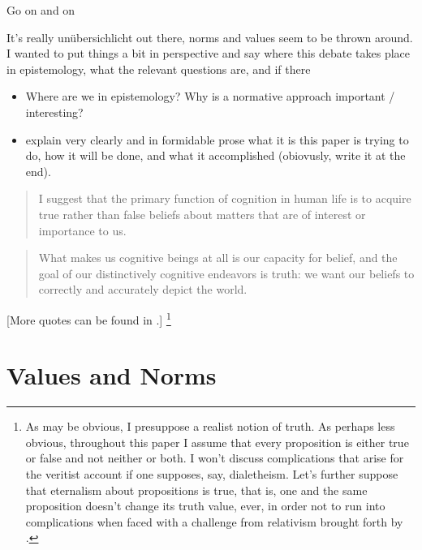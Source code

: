 \documentclass[12pt,numbers=noenddot]{scrartcl}
\begin{document}
Go on and on

It's really unübersichlicht out there, norms and values seem to be thrown around. I wanted to put things a bit in perspective and say where this debate takes place in epistemology, what the relevant questions are, and if there 
\begin{itemize}
    \item Where are we in epistemology? Why is a normative approach important / interesting?
    \item explain very clearly and in formidable prose what it is this paper is trying to do, how it will be done, and what it accomplished (obiovusly, write it at the end).
\end{itemize}

\begin{quote}
 I suggest that the primary function of cognition in human life is to acquire true rather than false beliefs about matters that are of interest or importance to us. \textcite[29]{Alston2005-ALSBJD}
\end{quote}

\begin{quote}
What makes us cognitive beings at all is our capacity for belief, and the goal of our distinctively cognitive endeavors is truth: we want our beliefs to correctly and accurately depict the world. \textcite[7]{Bonjour1985}
\end{quote}

[More quotes can be found in \textcite{Goldman2002-GOLTUO-2}.]
\footnote{As may be obvious, I presuppose a realist notion of truth. As perhaps less obvious, throughout this paper I assume that every proposition is either true or false and not neither or both. I won't discuss complications that arise for the veritist account if one supposes, say, dialetheism. Let's further suppose that eternalism about propositions is true, that is, one and the same proposition doesn't change its truth value, ever, in order not to run into complications when faced with a challenge from relativism brought forth by \textcite{Brogaard2008-BROTTA-3}.}

\section{Values and Norms}\label{sec:values}
\end{document}
